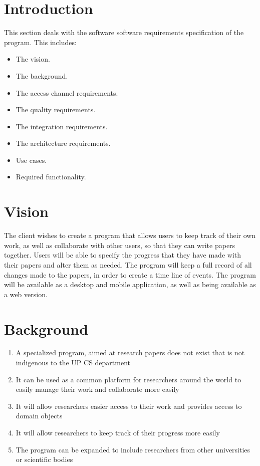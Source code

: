 \documentclass[hidelinks,a4paper,12pt]{article}
\begin{document}
	\footnotesize
	\normalsize
	
	
	\tableofcontents
	\newpage
	
	\newpage
	\section{Introduction} This section deals with the software software requirements specification of the program. This includes:
	\begin{itemize} 
		\item The vision.
		\item The background.
		\item The access channel requirements.
		\item The quality requirements.
		\item The integration requirements.
		\item The architecture requirements.
		\item Use cases.
		\item Required functionality.
	\end{itemize}
	
	\section{Vision}
	The client wishes to create a program that allows users to keep track of their own work, as well as collaborate with other users, so that they can write papers together. Users will be able to specify the progress that they have made with their papers and alter them as needed. The program will keep a full record of all changes made to the papers, in order to create a time line of events. The program will be available as a desktop and mobile application, as well as being available as a web version.
	
	\section{Background}
	\begin{enumerate}
		\item A specialized program, aimed at research papers does not exist that is not indigenous to the UP CS department
		\item It can be used as a common platform for researchers around the world to easily manage their work and collaborate more easily
		\item It will allow researchers easier access to their work and provides access to domain objects
		\item It will allow researchers to keep track of their progress more easily
		\item The program can be expanded to include researchers from other universities or scientific bodies
	\end{enumerate}
	\newpage
	
\end{document}
